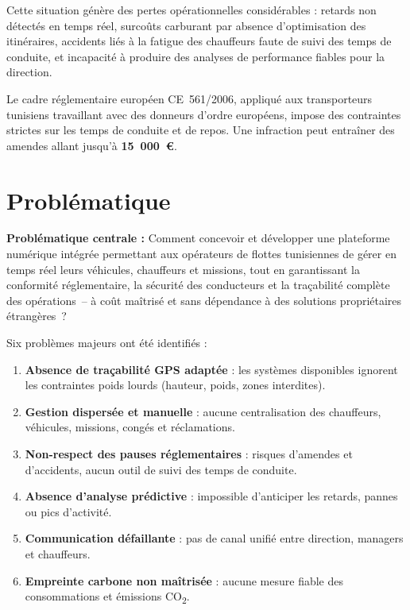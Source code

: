 \documentclass[12pt,a4paper]{report}
\begin{document}
 Cette situation génère des pertes opérationnelles considérables : 
 retards non détectés en temps réel, surcoûts carburant par absence 
 d'optimisation des itinéraires, accidents liés à la fatigue des chauffeurs 
 faute de suivi des temps de conduite, et incapacité à produire des analyses 
 de performance fiables pour la direction. 

 Le cadre réglementaire européen CE~561/2006, appliqué aux transporteurs 
 tunisiens travaillant avec des donneurs d'ordre européens, impose des 
 contraintes strictes sur les temps de conduite et de repos. Une infraction 
 peut entraîner des amendes allant jusqu'à \textbf{15~000~€}. 

\section{Problématique}
\label{sec:ch1-problematique}

\begin{tcolorbox}[keybox]
  \textbf{Problématique centrale :} Comment concevoir et développer une
  plateforme numérique intégrée permettant aux opérateurs de flottes
  tunisiennes de gérer en temps réel leurs véhicules, chauffeurs et missions,
  tout en garantissant la conformité réglementaire, la sécurité des conducteurs
  et la traçabilité complète des opérations~-- à coût maîtrisé et sans
  dépendance à des solutions propriétaires étrangères~?
\end{tcolorbox}

\medskip
Six problèmes majeurs ont été identifiés :

\begin{enumerate}
  \item \textbf{Absence de traçabilité GPS adaptée} : les systèmes disponibles
        ignorent les contraintes poids lourds (hauteur, poids, zones interdites).
  \item \textbf{Gestion dispersée et manuelle} : aucune centralisation des
        chauffeurs, véhicules, missions, congés et réclamations.
  \item \textbf{Non-respect des pauses réglementaires} : risques d'amendes et
        d'accidents, aucun outil de suivi des temps de conduite.
  \item \textbf{Absence d'analyse prédictive} : impossible d'anticiper les
        retards, pannes ou pics d'activité.
  \item \textbf{Communication défaillante} : pas de canal unifié entre
        direction, managers et chauffeurs.
  \item \textbf{Empreinte carbone non maîtrisée} : aucune mesure fiable
        des consommations et émissions CO\textsubscript{2}.
\end{enumerate}
\end{document}

